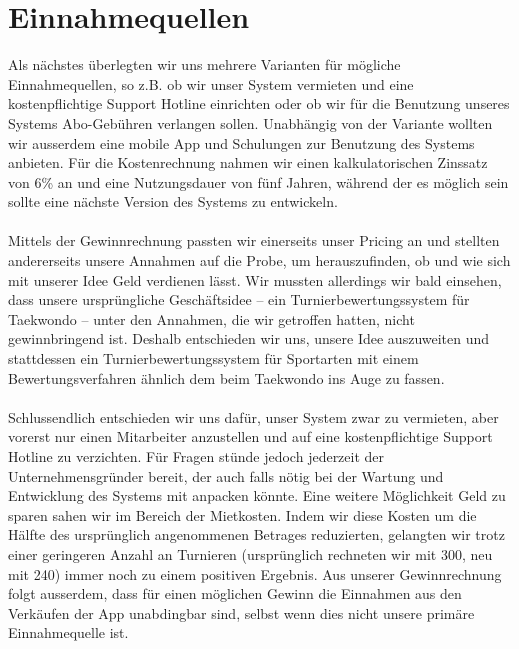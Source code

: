 \section{Einnahmequellen}
Als nächstes überlegten wir uns mehrere Varianten für mögliche Einnahmequellen, so z.B. ob wir unser System vermieten und
    eine kostenpflichtige Support Hotline einrichten oder ob wir für die Benutzung unseres Systems
    Abo-Gebühren verlangen sollen.
Unabhängig von der Variante wollten wir ausserdem eine mobile App und Schulungen zur Benutzung des Systems anbieten.
Für die Kostenrechnung nahmen wir einen kalkulatorischen Zinssatz von 6\% an und eine Nutzungsdauer von fünf Jahren,
während der es möglich sein sollte eine nächste Version des Systems zu entwickeln.
\\\\
Mittels der Gewinnrechnung passten wir einerseits unser Pricing an und stellten andererseits unsere Annahmen auf die Probe,
um herauszufinden, ob und wie sich mit unserer Idee Geld verdienen lässt.
Wir mussten allerdings wir bald einsehen, dass unsere ursprüngliche Geschäftsidee – ein Turnierbewertungssystem für
Taekwondo – unter den Annahmen, die wir getroffen hatten, nicht gewinnbringend ist.
Deshalb entschieden wir uns, unsere Idee auszuweiten und stattdessen ein Turnierbewertungssystem für Sportarten mit einem
Bewertungsverfahren ähnlich dem beim Taekwondo ins Auge zu fassen.
\\\\
Schlussendlich entschieden wir uns dafür, unser System zwar zu vermieten, aber vorerst nur einen Mitarbeiter anzustellen
und auf eine kostenpflichtige Support Hotline zu verzichten.
Für Fragen stünde jedoch jederzeit der Unternehmensgründer bereit, der auch falls nötig bei der Wartung und Entwicklung
des Systems mit anpacken könnte.
Eine weitere Möglichkeit Geld zu sparen sahen wir im Bereich der Mietkosten.
Indem wir diese Kosten um die Hälfte des ursprünglich angenommenen Betrages reduzierten, gelangten wir trotz einer
geringeren Anzahl an Turnieren (ursprünglich rechneten wir mit 300, neu mit 240) immer noch zu einem positiven Ergebnis.
Aus unserer Gewinnrechnung folgt ausserdem, dass für einen möglichen Gewinn die Einnahmen aus den Verkäufen der App unabdingbar sind,
selbst wenn dies nicht unsere primäre Einnahmequelle ist.


